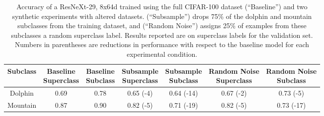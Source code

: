 \documentclass[sigconf]{acmart}
\begin{document}
\begin{table*}[]
\centering
\begin{tabular}{ccccccc}
\toprule
 Subclass & \makecell{Baseline \\ Superclass} & \makecell{Baseline \\ Subclass}   &  \makecell{Subsample \\ Superclass}    & \makecell{Subsample \\ Subclass}  &  \makecell{Random Noise \\ Superclass}    & \makecell{Random Noise \\ Subclass} \\
 \toprule
 Dolphin & 0.69 & 0.78  & 0.65 (-4)  & 0.64 (-14) & 0.67 (-2) & 0.73 (-5)   \\
 Mountain & 0.87 & 0.90  & 0.82 (-5) & 0.71 (-19) & 0.82 (-5) & 0.73 (-17)  \\
 \toprule
\end{tabular}
\caption{Accuracy of a ResNeXt-29, 8x64d trained using the full CIFAR-100 dataset (``Baseline'') and two synthetic experiments with altered datasets. (``Subsample'') drops 75\% of the dolphin and mountain subclasses from the training dataset, and (``Random Noise'') assigns 25\% of examples from these subclasses a random superclass label.  Results reported are on  superclass labels for the validation set.  Numbers in parentheses are reductions in performance with respect to the baseline model for each experimental condition.}
\label{tab:cifar1}
\end{table*}

\end{document}
